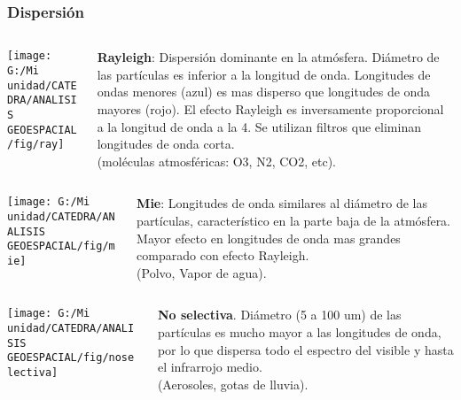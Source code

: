 \documentclass[14pt]{beamer}
\begin{document}
\begin{frame}
\frametitle{Dispersión}
  \begin{columns}
		\begin{column}{.3\linewidth}
		 \texttt{[image: G:/Mi unidad/CATEDRA/ANALISIS GEOESPACIAL/fig/ray]}
		\end{column}
		\begin{column}{.7\linewidth}
\scriptsize{\textbf{Rayleigh}: Dispersión dominante en la atmósfera. Diámetro de las partículas es inferior a la longitud de onda. Longitudes de ondas menores (azul) es mas disperso que longitudes de onda mayores (rojo). El efecto Rayleigh es inversamente proporcional a la longitud de onda a la 4. Se utilizan filtros que eliminan longitudes de onda corta.\\
(moléculas atmosféricas: O3, N2, CO2, etc)}.
		\end{column}
	\end{columns}
	\begin{columns}
		\begin{column}{.3\linewidth}
		 \texttt{[image: G:/Mi unidad/CATEDRA/ANALISIS GEOESPACIAL/fig/mie]}
		\end{column}
		\begin{column}{.7\linewidth}
\scriptsize{\textbf{Mie}: Longitudes de onda similares al diámetro de las partículas, característico en la parte baja de la atmósfera. Mayor efecto en longitudes de onda mas grandes comparado con efecto Rayleigh.\\
(Polvo, Vapor de agua).}
		\end{column}
	\end{columns}
	\begin{columns}
	 	\begin{column}{.3\linewidth}
		 \texttt{[image: G:/Mi unidad/CATEDRA/ANALISIS GEOESPACIAL/fig/noselectiva]}
		\end{column}
		\begin{column}{.7\linewidth}
\scriptsize{\textbf{No selectiva}. Diámetro (5  a 100 um) de las partículas es mucho mayor a las longitudes de onda, por lo que dispersa todo el espectro del visible y hasta el infrarrojo medio.\\
(Aerosoles, gotas de lluvia).}
		\end{column}
	\end{columns}
\end{frame}
\end{document}
